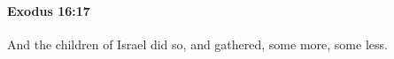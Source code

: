
		\paragraph{Exodus 16:17} %
			\label{EXODUS-16-17}

			And the children of Israel did so, and gathered, some more, some less.


